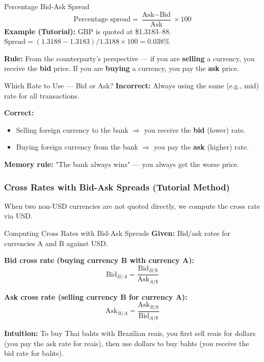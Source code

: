 \documentclass[11pt,a4paper]{article}
\begin{document}
\begin{formulabox}{Percentage Bid-Ask Spread}
\[
  \text{Percentage spread} = \frac{\text{Ask} - \text{Bid}}{\text{Ask}} \times 100
\]
\textbf{Example (Tutorial):} GBP is quoted at \$1.3183--88.\\
$\text{Spread} = (1.3188 - 1.3183)/1.3188 \times 100 = 0.038\%$

\textbf{Rule:} From the counterparty's perspective --- if you are \textbf{selling} a currency, you receive the \textbf{bid} price. If you are \textbf{buying} a currency, you pay the \textbf{ask} price.
\end{formulabox}

\begin{mistakebox}{Which Rate to Use --- Bid or Ask?}
\textbf{Incorrect:} Always using the same (e.g., mid) rate for all transactions.

\textbf{Correct:}
\begin{itemize}
  \item Selling foreign currency to the bank $\Rightarrow$ you receive the \textbf{bid} (lower) rate.
  \item Buying foreign currency from the bank $\Rightarrow$ you pay the \textbf{ask} (higher) rate.
\end{itemize}

\textbf{Memory rule:} "The bank always wins" --- you always get the worse price.
\end{mistakebox}

\subsubsection{Cross Rates with Bid-Ask Spreads (Tutorial Method)}

When two non-USD currencies are not quoted directly, we compute the cross rate via USD.

\begin{methodbox}{Computing Cross Rates with Bid-Ask Spreads}
\textbf{Given:} Bid/ask rates for currencies A and B against USD.

\textbf{Bid cross rate (buying currency B with currency A):}
\[
  \text{Bid}_{B/A} = \frac{\text{Bid}_{B/\$}}{\text{Ask}_{A/\$}}
\]

\textbf{Ask cross rate (selling currency B for currency A):}
\[
  \text{Ask}_{B/A} = \frac{\text{Ask}_{B/\$}}{\text{Bid}_{A/\$}}
\]

\textbf{Intuition:} To buy Thai bahts with Brazilian reais, you first sell reais for dollars (you pay the ask rate for reais), then use dollars to buy bahts (you receive the bid rate for bahts).
\end{methodbox}
\end{document}
